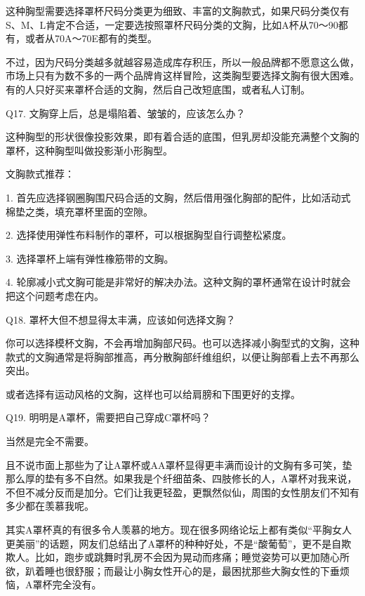 \documentclass[12pt,UTF8]{ctexbook}
\begin{document}
这种胸型需要选择罩杯尺码分类更为细致、丰富的文胸款式，如果尺码分类仅有S、M、L肯定不合适，一定要选按照罩杯尺码分类的文胸，比如A杯从70～90都有，或者从70A～70E都有的类型。

不过，因为尺码分类越多就越容易造成库存积压，所以一般品牌都不愿意这么做，市场上只有为数不多的一两个品牌肯这样冒险，这类胸型要选择文胸有很大困难。有的人只好买来罩杯合适的文胸，然后自己改短底围，或者私人订制。





Q17. 文胸穿上后，总是塌陷着、皱皱的，应该怎么办？


这种胸型的形状很像投影效果，即有着合适的底围，但乳房却没能充满整个文胸的罩杯，这种胸型叫做投影渐小形胸型。


文胸款式推荐：

1. 首先应选择钢圈胸围尺码合适的文胸，然后借用强化胸部的配件，比如活动式棉垫之类，填充罩杯里面的空隙。

2. 选择使用弹性布料制作的罩杯，可以根据胸型自行调整松紧度。

3. 选择罩杯上端有弹性橡筋带的文胸。

4. 轮廓减小式文胸可能是非常好的解决办法。这种文胸的罩杯通常在设计时就会把这个问题考虑在内。





Q18. 罩杯大但不想显得太丰满，应该如何选择文胸？


你可以选择模杯文胸，不会再增加胸部尺码。也可以选择减小胸型式的文胸，这种款式的文胸通常是将胸部推高，再分散胸部纤维组织，以便让胸部看上去不再那么突出。

或者选择有运动风格的文胸，这样也可以给肩膀和下围更好的支撑。





Q19. 明明是A罩杯，需要把自己穿成C罩杯吗？


当然是完全不需要。

且不说市面上那些为了让A罩杯或AA罩杯显得更丰满而设计的文胸有多可笑，垫那么厚的垫有多不自然。如果我是个纤细苗条、四肢修长的人，A罩杯对我来说，不但不减分反而是加分。它们让我更轻盈，更飘然似仙，周围的女性朋友们不知有多少都在羡慕我呢。

其实A罩杯真的有很多令人羡慕的地方。现在很多网络论坛上都有类似“平胸女人更美丽”的话题，网友们总结出了A罩杯的种种好处，不是“酸葡萄”，更不是自欺欺人。比如，跑步或跳舞时乳房不会因为晃动而疼痛；睡觉姿势可以更加随心所欲，趴着睡也很舒服；而最让小胸女性开心的是，最困扰那些大胸女性的下垂烦恼，A罩杯完全没有。
\end{document}
